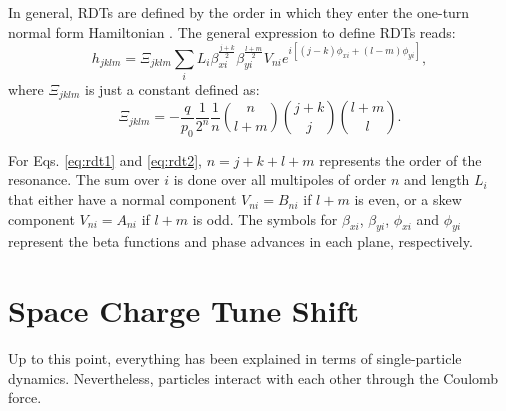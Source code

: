 In general, RDTs are defined by the order in which they enter the one-turn normal form Hamiltonian \cite{bartolini}. The general expression to define RDTs reads:
\begin{equation}
    \label{eq:rdt1}
    h_{jklm}=\Xi _{jklm} \sum_i L_i \beta_{xi}^{\frac{j+k}{2}} \beta_{yi}^{\frac{l+m}{2}} V_{ni}e^{i\left[ (j-k)\phi_{xi} +(l-m) \phi_{yi} \right]},
\end{equation}
where $\Xi _{jklm}$ is just a constant defined as:
\begin{equation}
    \label{eq:rdt2}
    \Xi _{jklm} = -\frac{q}{p_0}\frac{1}{2^n}\frac{1}{n} {\binom{n}{l+m}} {\binom{j+k}{j}}{\binom{l+m}{l}}.
\end{equation}

For Eqs. \ref{eq:rdt1} and \ref{eq:rdt2}, $n=j+k+l+m$ represents the order of the resonance. The sum over $i$ is done over all multipoles of order $n$ and length $L_i$ that either have a normal component $V_{ni}=B_{ni}$ if $l+m$ is even, or a skew component $V_{ni}=A_{ni}$ if $l+m$ is odd. The symbols for $\beta_{xi}$, $\beta_{yi}$, $\phi_{xi}$ and $\phi_{yi}$ represent the beta functions and phase advances in each plane, respectively.

\section{\label{sec:sc1}Space Charge Tune Shift}

Up to this point, everything has been explained in terms of single-particle dynamics. Nevertheless, particles interact with each other through the Coulomb force. 